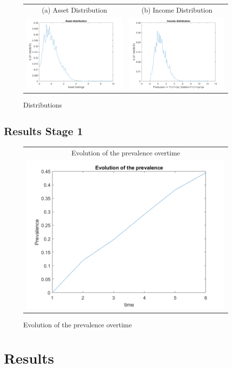 \begin{figure}[H]
\caption{Distributions}
\hspace{-2.0cm}
\begin{center}
\begin{tabular}{cc}
\multicolumn{1}{c}{(a) Asset Distribution} &
\multicolumn{1}{c}{(b) Income Distribution} \\
\includegraphics[angle=0,width=.5\textwidth]{figures/FIG9.png}   &
\includegraphics[angle=0,width=.5\textwidth]{figures/FIG10.png}
\end{tabular}
\end{center}
\label{fig:4}
\end{figure}


\subsection{Results Stage 1}
\begin{figure}[H]
\caption{Evolution of the prevalence overtime}
\hspace{-2.0cm}
\begin{center}
\begin{tabular}{c}
\multicolumn{1}{c}{Evolution of the prevalence overtime} \\
\includegraphics[angle=0,width=.5\textwidth]{figures/PREV.png}
\end{tabular}
\end{center}
\label{fig:6}
\end{figure}
\newpage

\section{Results}





\clearpage
